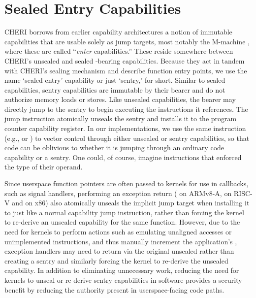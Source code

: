 \section{Sealed Entry Capabilities}
\label{sec:arch-sentry}

CHERI borrows from earlier capability architectures a notion of immutable
capabilities that are usable solely as jump targets, most notably the
M-machine \cite{carter:mmachine94}, where these are called ``\emph{enter}
capabilities.''
%
These reside somewhere between CHERI's unsealed and sealed
\cappermX-bearing capabilities.  Because they act in tandem with
CHERI's sealing mechanism and describe function entry points, we use the
name `sealed entry' capability or just `sentry,' for short.
%
Similar to sealed capabilities, sentry capabilities are immutable by their
bearer and do not authorize memory loads or stores.  Like unsealed
capabilities, the bearer may directly jump to the sentry to begin executing
the instructions it references.  The jump instruction atomically unseals the
sentry and installs it to the program counter capability register.  In our
implementations, we use the same instruction (e.g.,  or
) to vector control through either unsealed or sentry
capabilities, so that code can be oblivious to whether it is jumping through
an ordinary code capability or a sentry.  One could, of course, imagine
instructions that enforced the type of their operand.

Since userspace function pointers are often passed to kernels for use in
callbacks, such as signal handlers, performing an exception return
( on ARMv8-A, \xRET{} on RISC-V and
 on x86) also atomically unseals the implicit jump target
when installing it to \PCC{} just like a normal capability jump instruction,
rather than forcing the kernel to re-derive an unsealed capability for the same
function. However, due to the need for kernels to perform actions such as
emulating unaligned accesses or unimplemented instructions, and thus manually
increment the application's \PCC{}, exception handlers may need to
return via the original unsealed
\PCC{} rather than creating a sentry and similarly forcing the
kernel to re-derive the unsealed capability. In addition to eliminating
unnecessary work, reducing the need for kernels to unseal or re-derive sentry
capabilities in software provides a security benefit by reducing the authority
present in userspace-facing code paths.

